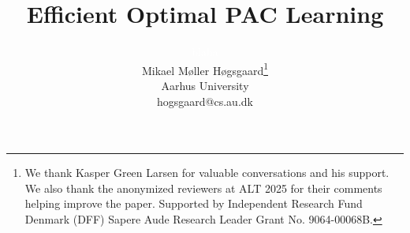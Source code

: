 \documentclass[11pt]{article}
\title{Efficient Optimal PAC Learning}
\date{}
\author{ \textcolor{white}{ blaba}\\Mikael {M\o ller H\o gsgaard}\thanks{We thank Kasper Green Larsen for valuable conversations and his support. We also thank the anonymized reviewers at ALT 2025 for their comments helping improve the paper. Supported by Independent
Research Fund Denmark (DFF) Sapere Aude Research Leader Grant No. 9064-00068B. } \\ Aarhus University\\hogsgaard@cs.au.dk }
\begin{document}
\maketitle

\begin{abstract}
  
\end{abstract}

 
 


 




\appendix




\end{document}
